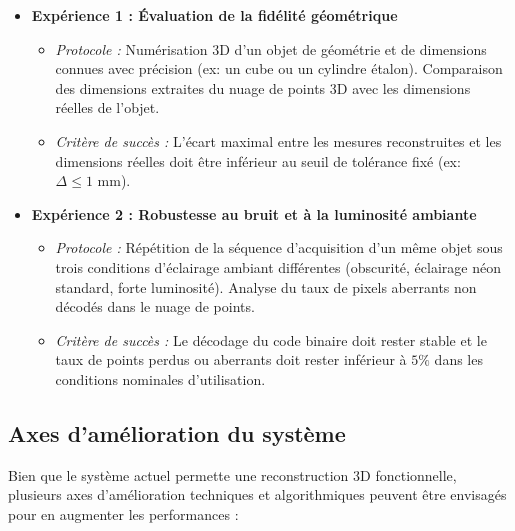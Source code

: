 \documentclass[10pt]{article} %
\begin{document}
\begin{itemize}
    \item \textbf{Expérience 1 : Évaluation de la fidélité géométrique}
    \begin{itemize}
        \item \textit{Protocole :} Numérisation 3D d'un objet de géométrie et de dimensions connues avec précision (ex: un cube ou un cylindre étalon). Comparaison des dimensions extraites du nuage de points 3D avec les dimensions réelles de l'objet.
        \item \textit{Critère de succès :} L'écart maximal entre les mesures reconstruites et les dimensions réelles doit être inférieur au seuil de tolérance fixé (ex: $\Delta \le 1 \text{ mm}$).
    \end{itemize}

    \item \textbf{Expérience 2 : Robustesse au bruit et à la luminosité ambiante}
    \begin{itemize}
        \item \textit{Protocole :} Répétition de la séquence d'acquisition d'un même objet sous trois conditions d'éclairage ambiant différentes (obscurité, éclairage néon standard, forte luminosité). Analyse du taux de pixels aberrants non décodés dans le nuage de points.
        \item \textit{Critère de succès :} Le décodage du code binaire doit rester stable et le taux de points perdus ou aberrants doit rester inférieur à $5\%$ dans les conditions nominales d'utilisation.
    \end{itemize}
\end{itemize}

\subsection{Axes d'amélioration du système}

Bien que le système actuel permette une reconstruction 3D fonctionnelle, plusieurs axes d'amélioration techniques et algorithmiques peuvent être envisagés pour en augmenter les performances :
\end{document}
